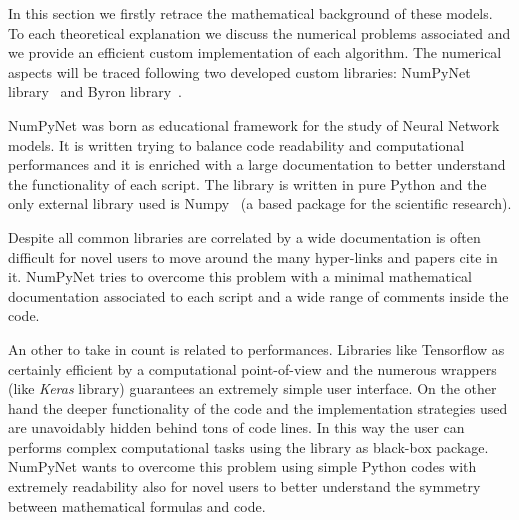 \documentclass{standalone}
\begin{document}
In this section we firstly retrace the mathematical background of these models.
To each theoretical explanation we discuss the numerical problems associated and we provide an efficient custom implementation of each algorithm.
The numerical aspects will be traced following two developed custom libraries: \textsf{NumPyNet} library~\cite{NumPyNet} and \textsf{Byron} library~\cite{Byron}.

\textsf{NumPyNet} was born as educational framework for the study of Neural Network models.
It is written trying to balance code readability and computational performances and it is enriched with a large documentation to better understand the functionality of each script.
The library is written in pure \textsf{Python} and the only external library used is \textsf{Numpy}~\cite{Numpy} (a based package for the scientific research).

Despite all common libraries are correlated by a wide documentation is often difficult for novel users to move around the many hyper-links and papers cite in it.
\textsf{NumPyNet} tries to overcome this problem with a minimal mathematical documentation associated to each script and a wide range of comments inside the code.

An other  to take in count is related to performances.
Libraries like \textsf{Tensorflow} as certainly efficient by a computational point-of-view and the numerous wrappers (like \emph{Keras} library) guarantees an extremely simple user interface.
On the other hand the deeper functionality of the code and the implementation strategies used are unavoidably hidden behind tons of code lines.
In this way the user can performs complex computational tasks using the library as black-box package.
\textsf{NumPyNet} wants to overcome this problem using simple \textsf{Python} codes with extremely readability also for novel users to better understand the symmetry between mathematical formulas and code.
\end{document}
